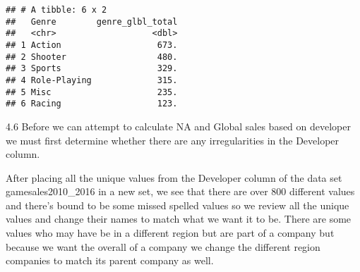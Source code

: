 \documentclass[
]{article}
\newenvironment{Shaded}{\begin{snugshade}}{\end{snugshade}}
\newcommand{\CommentTok}[1]{\textcolor[rgb]{0.56,0.35,0.01}{\textit{#1}}}
\newcommand{\FunctionTok}[1]{\textcolor[rgb]{0.00,0.00,0.00}{#1}}
\newcommand{\NormalTok}[1]{#1}
\newcommand{\OtherTok}[1]{\textcolor[rgb]{0.56,0.35,0.01}{#1}}
\newcommand{\SpecialCharTok}[1]{\textcolor[rgb]{0.00,0.00,0.00}{#1}}
\begin{document}
\begin{verbatim}
## # A tibble: 6 x 2
##   Genre        genre_glbl_total
##   <chr>                   <dbl>
## 1 Action                   673.
## 2 Shooter                  480.
## 3 Sports                   329.
## 4 Role-Playing             315.
## 5 Misc                     235.
## 6 Racing                   123.
\end{verbatim}

4.6 Before we can attempt to calculate NA and Global sales based on
developer we must first determine whether there are any irregularities
in the Developer column.

\begin{Shaded}
\end{Shaded}

After placing all the unique values from the Developer column of the
data set gamesales2010\_2016 in a new set, we see that there are over
800 different values and there's bound to be some missed spelled values
so we review all the unique values and change their names to match what
we want it to be. There are some values who may have be in a different
region but are part of a company but because we want the overall of a
company we change the different region companies to match its parent
company as well.
\end{document}
